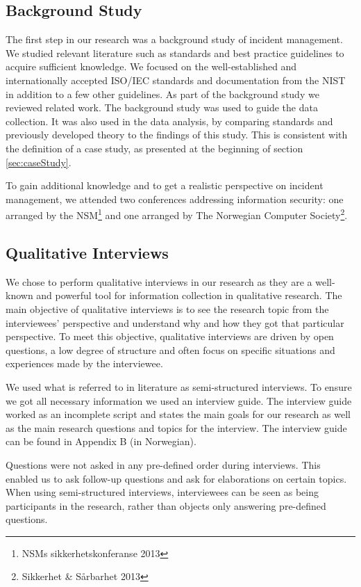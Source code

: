 \subsection{Background Study}
\label{sec:background}
The first step in our research was a background study of incident management. We studied relevant literature such as standards and best practice guidelines to acquire sufficient knowledge. We focused on the well-established and internationally accepted ISO/IEC standards and documentation from the \ac{NIST} in addition to a few other guidelines. As part of the background study we reviewed related work. The background study was used to guide the data collection. It was also used in the data analysis, by comparing standards and previously developed theory to the findings of this study. This is consistent with the definition of a case study, as presented at the beginning of section \ref{sec:caseStudy}.

To gain additional knowledge and to get a realistic perspective on incident management, we attended two conferences addressing information security: one arranged by the \ac{NSM}\footnote{NSMs sikkerhetskonferanse 2013} and one arranged by The Norwegian Computer Society\footnote{Sikkerhet \& S\aa rbarhet 2013}.

\subsection{Qualitative Interviews}
\label{sec:interviews}
We chose to perform qualitative interviews in our research as they are a well-known and powerful tool for information collection in qualitative research\cite{myers2007qualitative}. The main objective of qualitative interviews is to see the research topic from the interviewees' perspective and understand why and how they got that particular perspective\cite{cassell2004essential}. To meet this objective, qualitative interviews are driven by open questions, a low degree of structure and often focus on specific situations and experiences made by the interviewee. 

We used what is referred to in literature as semi-structured interviews\cite{cassell2004essential}. To ensure we got all necessary information we used an interview guide. The interview guide worked as an incomplete script and states the main goals for our research as well as the main research questions and topics for the interview. The interview guide can be found in Appendix B (in Norwegian).

Questions were not asked in any pre-defined order during interviews. This enabled us to ask follow-up questions and ask for elaborations on certain topics. When using semi-structured interviews, interviewees can be seen as being participants in the research, rather than objects only answering pre-defined questions.

